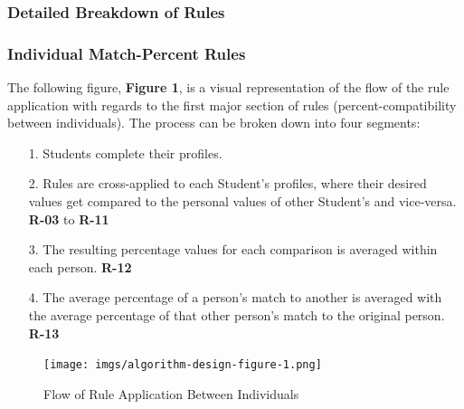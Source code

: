 \documentclass[12pt,letterpaper]{article}
\begin{document}
\newpage{}

\subsubsection{Detailed Breakdown of Rules}
\subsubsection*{Individual Match-Percent Rules}
The following figure, {\bf Figure 1},  is a visual representation of the flow of the rule application with regards to the first major section of rules (percent-compatibility between individuals). The process can be broken down into four segments:
\begin{enumerate}
	\item[1.] Students complete their profiles.
	\item[2.] Rules are cross-applied to each Student's profiles, where their desired values get compared to the personal values of other Student's and vice-versa. {\bf R-03} to {\bf R-11}
	\item[3.] The resulting percentage values for each comparison is averaged within each person. {\bf R-12}
	\item[4.] The average percentage of a person's match to another is averaged with the average percentage of that other person's match to the original person. {\bf R-13}
\end{enumerate}

\begin{figure}[H]
	\caption{Flow of Rule Application Between Individuals}
	\begin{center}
		\texttt{[image: imgs/algorithm-design-figure-1.png]}
	\end{center}
\end{figure}
\end{document}
